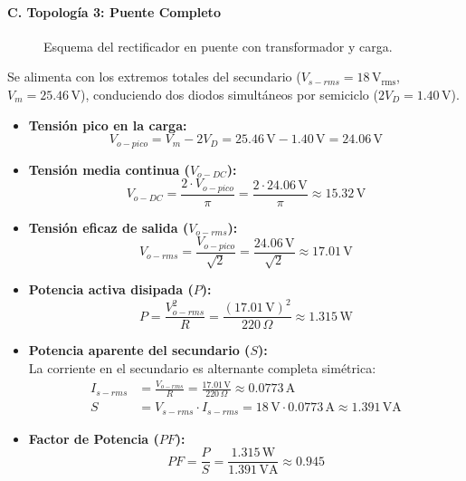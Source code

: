 \paragraph{C. Topología 3: Puente Completo}

\begin{figure}[H]
  \centering
  \renewcommand{\etqFuente}{v_s\ (18\,\mathrm{V_{rms}})}
  \renewcommand{\etqCarga}{R\,(220\,\Omega)}
  \resizebox{0.8\columnwidth}{!}{}
  \caption{Esquema del rectificador en puente con transformador y carga.}
  \label{fig:puente_rectificador}
\end{figure}

Se alimenta con los extremos totales del secundario ($V_{s-rms} = 18\,\mathrm{V_{rms}}$, $V_m = 25.46\,\mathrm{V}$), conduciendo dos diodos simultáneos por semiciclo ($2V_D = 1.40\,\mathrm{V}$).
\begin{itemize}
    \item \textbf{Tensión pico en la carga:}
    \begin{equation}
        V_{o-pico} = V_m - 2V_D = 25.46\,\mathrm{V} - 1.40\,\mathrm{V} = \mathbf{24.06\,\mathrm{V}}
    \end{equation}
    \item \textbf{Tensión media continua ($V_{o-DC}$):}
    \begin{equation}
        V_{o-DC} = \frac{2 \cdot V_{o-pico}}{\pi} = \frac{2 \cdot 24.06\,\mathrm{V}}{\pi} \approx \mathbf{15.32\,\mathrm{V}}
    \end{equation}
    \item \textbf{Tensión eficaz de salida ($V_{o-rms}$):}
    \begin{equation}
        V_{o-rms} = \frac{V_{o-pico}}{\sqrt{2}} = \frac{24.06\,\mathrm{V}}{\sqrt{2}} \approx \mathbf{17.01\,\mathrm{V}}
    \end{equation}
    \item \textbf{Potencia activa disipada ($P$):}
    \begin{equation}
        P = \frac{V_{o-rms}^2}{R} = \frac{(17.01\,\mathrm{V})^2}{220\,\Omega} \approx \mathbf{1.315\,\mathrm{W}}
    \end{equation}
    \item \textbf{Potencia aparente del secundario ($S$):}\\
    La corriente en el secundario es alternante completa simétrica:
    \begin{align}
        I_{s-rms} &= \frac{V_{o-rms}}{R} = \frac{17.01\,\mathrm{V}}{220\,\Omega} \approx 0.0773\,\mathrm{A} \\
        S &= V_{s-rms} \cdot I_{s-rms} = 18\,\mathrm{V} \cdot 0.0773\,\mathrm{A} \approx \mathbf{1.391\,\mathrm{VA}}
    \end{align}
    \item \textbf{Factor de Potencia ($PF$):}
    \begin{equation}
        PF = \frac{P}{S} = \frac{1.315\,\mathrm{W}}{1.391\,\mathrm{VA}} \approx \mathbf{0.945}
    \end{equation}
\end{itemize}

